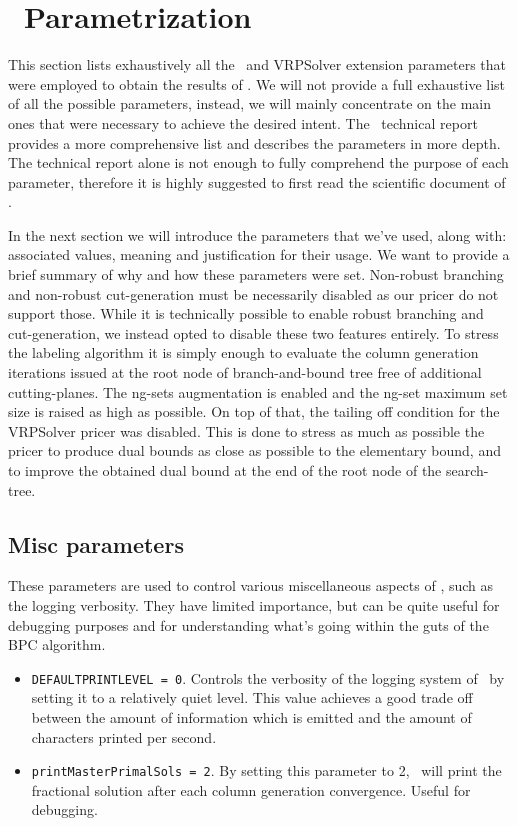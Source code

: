 \chapter{\bapcod\ Parametrization}
\label{sec:bapcod-appendix}

This section lists exhaustively all the \bapcod\ and VRPSolver extension
parameters that were employed  to obtain the results of .
We will not provide a full exhaustive list of all the possible parameters,
instead, we will mainly concentrate on the main ones that were necessary to achieve
the desired intent.
The \bapcod\ technical report \textcite{sadykov2021} provides a more
comprehensive list and describes the parameters in more depth.
The technical report alone is not enough to fully comprehend the purpose of each parameter,
therefore it is highly suggested to first read the scientific document of \textcite{pessoa2020a}.

\medskip

In the next section we will introduce the parameters that we've used, along
with: associated values, meaning and justification for their usage.
We want to provide a brief summary of why and how these parameters were set.
Non-robust branching and non-robust cut-generation
must be necessarily disabled as our pricer do not support those.
While it is technically possible to enable robust branching and cut-generation,
we instead opted to disable these two features entirely.
To stress the labeling algorithm it is simply enough to evaluate
the column generation iterations issued at the root node of branch-and-bound tree
free of additional cutting-planes.
The ng-sets augmentation is enabled and the ng-set maximum
set size is raised as high as possible.
On top of that, the tailing off condition for the VRPSolver pricer was disabled.
This is done to stress as much as possible the pricer to produce
dual bounds as close as possible to the elementary bound, and to
improve the obtained dual bound at the end of the root node of the search-tree.

\section{Misc parameters}
These parameters are used to control various miscellaneous aspects of \bapcod,
such as the logging verbosity.
They have limited importance, but can be quite useful for debugging purposes
and for understanding what's going within the guts of the BPC algorithm.

\begin{itemize}
	\item \texttt{DEFAULTPRINTLEVEL = 0}.
	      Controls the verbosity of the logging system of \bapcod\ by setting it to a relatively quiet level.
	      This value achieves a good trade off between the amount of information which is emitted
	      and the amount of characters printed per second.
	\item \texttt{printMasterPrimalSols = 2}.
	      By setting this parameter to 2, \bapcod\ will print the fractional solution after each column generation convergence.
	      Useful for debugging.
\end{itemize}

